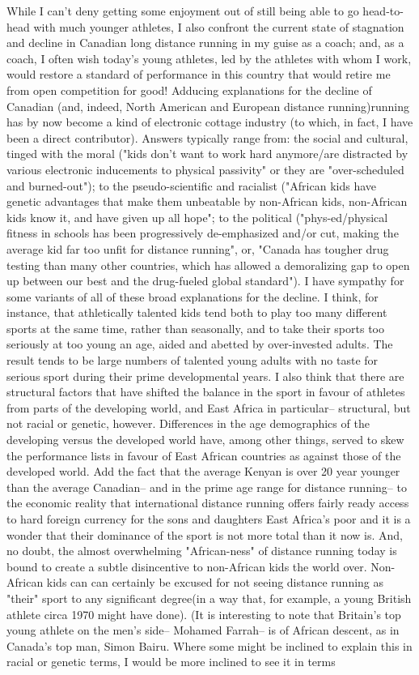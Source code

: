While I can't deny getting some enjoyment out of still being able to go head-to-head with much younger athletes, I also confront the current state of stagnation and decline in Canadian long distance running in my guise as a coach; and, as a coach, I often wish today's young athletes, led by the athletes with whom I work, would restore a standard of performance in this country that would retire me from open competition for good! Adducing explanations for the decline of Canadian (and, indeed, North American and European distance running)running has by now become a kind of electronic cottage industry (to which, in fact, I have been a direct contributor). Answers typically range from: the social and cultural, tinged with the moral ("kids don't want to work hard anymore/are distracted by various electronic inducements to physical passivity" or they are "over-scheduled and burned-out"); to the pseudo-scientific and racialist ("African kids have genetic advantages that make them unbeatable by non-African kids, non-African kids know it, and have given up all hope"; to the political ("phys-ed/physical fitness in schools has been progressively de-emphasized and/or cut, making the average kid far too unfit for distance running", or, "Canada has tougher drug testing than many other countries, which has allowed a demoralizing gap to open up between our best and the drug-fueled global standard"). I have sympathy for some variants of all of these broad explanations for the decline. I think, for instance, that athletically talented kids tend both to play too many different sports at the same time, rather than seasonally, and to take their sports too seriously at too young an age, aided and abetted by over-invested adults. The result tends to be large numbers of talented young adults with no taste for serious sport during their prime developmental years. I also think that there are structural factors that have shifted the balance in the sport in favour of athletes from parts of the developing world, and East Africa in particular-- structural, but not racial or genetic, however. Differences in the age demographics of the developing versus the developed world have, among other things, served to skew the performance lists in favour of East African countries as against those of the developed world. Add the fact that the average Kenyan is over 20 year younger than the average Canadian-- and in the prime age range for distance running-- to the economic reality that international distance running offers fairly ready access to hard foreign currency for the sons and daughters East Africa's poor and it is a wonder that their dominance of the sport is not more total than it now is. And, no doubt, the almost overwhelming "African-ness" of distance running today is bound to create a subtle disincentive to non-African kids the world over. Non-African kids can can certainly be excused for not seeing distance running as "their" sport to any significant degree(in a way that, for example, a young British athlete circa 1970 might have done). (It is interesting to note that Britain's top young athlete on the men's side-- Mohamed Farrah-- is of African descent, as in Canada's top man, Simon Bairu. Where some might be inclined to explain this in racial or genetic terms, I would be more inclined to see it in terms 